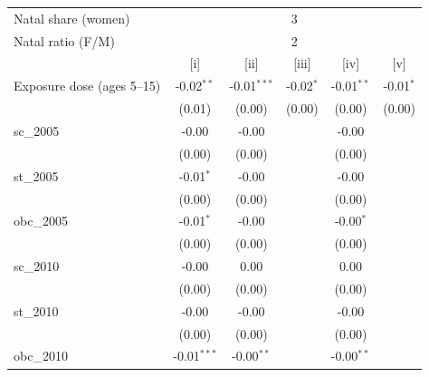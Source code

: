 {\centering\scriptsize
\begingroup
\begin{tabular}{@{}lccccc@{}}
   \toprule
   Natal share (women) & \multicolumn{5}{c}{3} \\ 
   Natal ratio (F/M) & \multicolumn{5}{c}{2} \\ 
                                                    & [i]           & [ii]          & [iii]         & [iv]          & [v]\\  
   \midrule 
   Exposure dose (ages 5--15)                       & -0.02$^{**}$  & -0.01$^{***}$ & -0.02$^{*}$   & -0.01$^{**}$  & -0.01$^{*}$\\   
                                                    & (0.01)        & (0.00)       & (0.00)       & (0.00)       & (0.00)\\   
   sc\_2005                                         & -0.00        & -0.00       &               & -0.00        &   \\   
                                                    & (0.00)       & (0.00)       &               & (0.00)       &   \\   
   st\_2005                                         & -0.01$^{*}$   & -0.00        &               & -0.00        &   \\   
                                                    & (0.00)       & (0.00)       &               & (0.00)       &   \\   
   obc\_2005                                        & -0.01$^{*}$  & -0.00        &               & -0.00$^{*}$  &   \\   
                                                    & (0.00)       & (0.00)       &               & (0.00)       &   \\   
   sc\_2010                                         & -0.00       & 0.00         &               & 0.00         &   \\   
                                                    & (0.00)       & (0.00)       &               & (0.00)       &   \\   
   st\_2010                                         & -0.00        & -0.00        &               & -0.00        &   \\   
                                                    & (0.00)       & (0.00)       &               & (0.00)       &   \\   
   obc\_2010                                        & -0.01$^{***}$ & -0.00$^{**}$ &               & -0.00$^{**}$ &   \\   

\end{tabular}}
